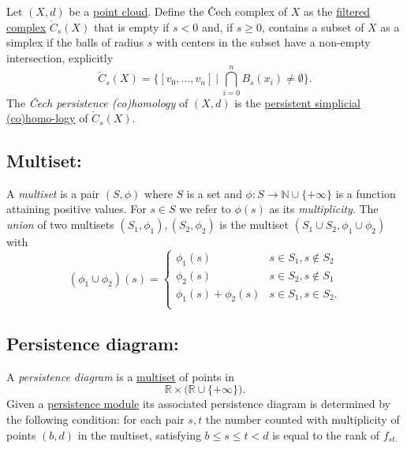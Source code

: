 \documentclass{amsart}
\begin{document}
	Let $(X, d)$ be a \hyperref[finite metric spaces and point clouds]{point cloud}. Define the \v{C}ech complex of $X$ as the \hyperref[filtered complex]{filtered complex} $\check{C}_s(X)$ that is empty if $s<0$ and, if $s \geq 0$, contains a subset of $X$ as a simplex if the balls of radius $s$ with centers in the subset have a non-empty intersection, explicitly
	\begin{equation*}
	\check{C}_s(X) = \Big\{ [v_0,\dots,v_n]\ \Big|\ \bigcap_{i=0}^n B_s(x_i) \neq \emptyset \Big\}.
	\end{equation*}
	The \textit{\v Cech persistence (co)homology} of $(X,d)$ is the \hyperref[persistent simplicial (co)homology]{persistent simplicial (co)homo-logy} of $\check{C}_s(X)$.
	
	\subsection*{Multiset:} \label{multiset}
	
	A \textit{multiset} is a pair $(S, \phi)$ where $S$ is a set and $\phi : S \to \mathbb N \cup \{+\infty\}$ is a function attaining positive values. For $s \in S$ we refer to $\phi(s)$ as its \textit{multiplicity}. The \textit{union} of two multisets $(S_1, \phi_1), (S_2, \phi_2)$ is the multiset $(S_1 \cup S_2, \phi_1 \cup \phi_2)$ with
	\begin{equation*}
	(\phi_1 \cup \phi_2)(s) = 
	\begin{cases}
	\phi_1(s) & s \in S_1, s \not\in S_2 \\
	\phi_2(s) & s \in S_2, s \not\in S_1 \\
	\phi_1(s) + \phi_2(s) & s \in S_1, s \in S_2. \\
	\end{cases}
	\end{equation*}
	
	\subsection*{Persistence diagram:} \label{persistence diagram}
	
	A \textit{persistence diagram} is a \hyperref[multiset]{multiset} of points in
	\begin{equation*}
	\mathbb R \times \big( \mathbb{R} \cup \{+\infty\} \big).
	\end{equation*}	
	Given a \hyperref[persistence module]{persistence module} its associated persistence diagram is determined by the following condition: for each pair $s,t$ the number counted with multiplicity of points $(b,d)$ in the multiset, satisfying $b \leq s \leq t < d$ is equal to the rank of $f_{st.}$
	
\end{document}
